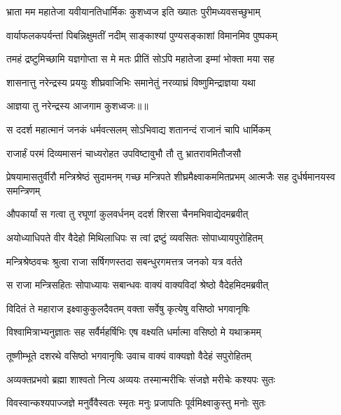 \twolineshloka
{भ्राता मम महातेजा यवीयानतिधार्मिकः}
{कुशध्वज इति ख्यातः पुरीमध्यवसच्छुभाम्} %

\twolineshloka
{वार्याफलकपर्यन्तां पिबन्निक्षुमतीं नदीम्}
{साङ्काश्यां पुण्यसङ्काशां विमानमिव पुष्पकम्} %

\twolineshloka
{तमहं द्रष्टुमिच्छामि यज्ञगोप्ता स मे मतः}
{प्रीतिं सोऽपि महातेजा इम्मां भोक्ता मया सह} %

\twolineshloka
{शासनात्तु नरेन्द्रस्य प्रययुः शीघ्रवाजिभिः}
{समानेतुं नरव्याघ्रं विष्णुमिन्द्राज्ञया यथा} %

{आज्ञया तु नरेन्द्रस्य आजगाम कुशध्वजः॥॥} %

\addtocounter{shlokacount}{1}

\twolineshloka
{स ददर्श महात्मानं जनकं धर्मवत्सलम्}
{सोऽभिवाद्य शतानन्दं राजानं चापि धार्मिकम्} %

\twolineshloka
{राजार्हं परमं दिव्यमासनं चाध्यरोहत}
{उपविष्टावुभौ तौ तु भ्रातरावमितौजसौ} %

\threelineshloka
{प्रेषयामासतुर्वीरौ मन्त्रिश्रेष्ठं सुदामनम्}
{गच्छ मन्त्रिपते शीघ्रमैक्ष्वाकममितप्रभम्}
{आत्मजैः सह दुर्धर्षमानयस्व समन्त्रिणम्} %

\twolineshloka
{औपकार्यां स गत्वा तु रघूणां कुलवर्धनम्}
{ददर्श शिरसा चैनमभिवाद्येदमब्रवीत्} %

\twolineshloka
{अयोध्याधिपते वीर वैदेहो मिथिलाधिपः}
{स त्वां द्रष्टुं व्यवसितः सोपाध्यायपुरोहितम्} %

\twolineshloka
{मन्त्रिश्रेष्ठवचः श्रुत्वा राजा सर्षिगणस्तदा}
{सबन्धुरगमत्तत्र जनको यत्र वर्तते} %

\twolineshloka
{स राजा मन्त्रिसहितः सोपाध्यायः सबान्धवः}
{वाक्यं वाक्यविदां श्रेष्ठो वैदेहमिदमब्रवीत्} %

\twolineshloka
{विदितं ते महाराज इक्ष्वाकुकुलदैवतम्}
{वक्ता सर्वेषु कृत्येषु वसिष्ठो भगवानृषिः} %

\twolineshloka
{विश्वामित्राभ्यनुज्ञातः सह सर्वैर्महर्षिभिः}
{एष वक्ष्यति धर्मात्मा वसिष्ठो मे यथाक्रमम्} %

\twolineshloka
{तूष्णीम्भूते दशरथे वसिष्ठो भगवानृषिः}
{उवाच वाक्यं वाक्यज्ञो वैदेहं सपुरोहितम्} %

\twolineshloka
{अव्यक्तप्रभवो ब्रह्मा शाश्वतो नित्य अव्ययः}
{तस्मान्मरीचिः संजज्ञे मरीचेः कश्यपः सुतः} %

\twolineshloka
{विवस्वान्कश्यपाज्जज्ञे मनुर्वैवैस्वतः स्मृतः}
{मनुः प्रजापतिः पूर्वमिक्ष्वाकुस्तु मनोः सुतः} %

